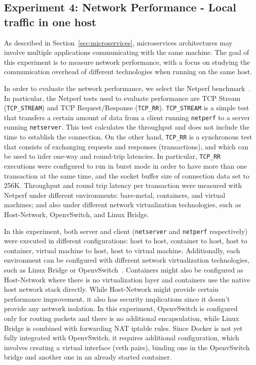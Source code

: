 \documentclass[conference]{IEEEtran}
\begin{document}
\subsection{Experiment 4: Network Performance - Local traffic in one host}
\label{sub:exp4}

As described in Section~\ref{sec:microservices}, microservices architectures
may involve multiple applications communicating with the same machine. The goal
of this experiment is to measure network performance, with a focus on studying
the communication overhead of different technologies when running on the same
host.

In order to evaluate the network performance, we select the Netperf
benchmark~\cite{netperf}. In particular, the Netperf tests used to evaluate
performance are TCP Stream (\texttt{TCP\_STREAM}) and TCP Request$/$Response
(\texttt{TCP\_RR}). \texttt{TCP\_STREAM} is a simple test that transfers a
certain amount of data from a client running \texttt{netperf} to a server
running \texttt{netserver}. This test calculates the throughput and does not
include the time to establish the connection. On the other hand,
\texttt{TCP\_RR} is a synchronous test that consists of exchanging requests
and responses (transactions), and which can be used to infer one-way and
round-trip latencies.  In particular, \texttt{TCP\_RR} executions were
configured to run in burst mode in order to have more than one transaction at
the same time, and the socket buffer size of connection data set to 256K.
Throughput and round trip latency per transaction were measured with Netperf
under different environments: bare-metal, containers, and virtual machines;
and also under different network virtualization technologies, such as
Host-Network, OpenvSwitch, and Linux Bridge.

In this experiment, both server and client (\texttt{netserver} and
\texttt{netperf} respectively) were executed in different configurations: host
to host, container to host, host to container, virtual machine to host, host
to virtual machine.  Additionally, each environment can be configured with
different network virtualization technologies, such as Linux Bridge or
OpenvSwitch~\cite{OVS}. Containers might also be configured as Host-Network
where there is no virtualization layer and containers use the native host
network stack directly. While Host-Network might provide certain performance
improvement, it also has security implications since it doesn't provide any
network isolation. In this experiment, OpenvSwitch is configured only for
routing packets and there is no additional encapsulation, while Linux Bridge
is combined with forwarding NAT iptable rules. Since Docker is not yet fully
integrated with OpenvSwitch, it requires additional configuration, which
involves creating a virtual interface (veth pairs), binding one in the 
OpenvSwitch bridge and another one in an already started container.
\end{document}
